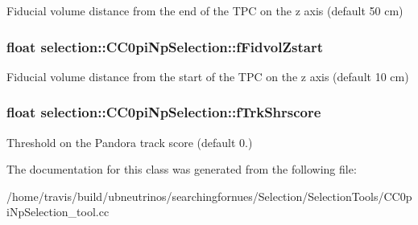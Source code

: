 Fiducial volume distance from the end of the T\-P\-C on the z axis (default 50 cm) \hypertarget{classselection_1_1CC0piNpSelection_afe5a2b82ecad103b98362839094c47e0}{
\subsubsection[{f\-Fidvol\-Zstart}]{\setlength{\rightskip}{0pt plus 5cm}float selection\-::\-C\-C0pi\-Np\-Selection\-::f\-Fidvol\-Zstart\hspace{0.3cm}{\ttfamily [private]}}}\label{classselection_1_1CC0piNpSelection_afe5a2b82ecad103b98362839094c47e0}
Fiducial volume distance from the start of the T\-P\-C on the z axis (default 10 cm) \hypertarget{classselection_1_1CC0piNpSelection_ab72eccf7dab3acafa294a0d8f3e225a0}{
\subsubsection[{f\-Trk\-Shrscore}]{\setlength{\rightskip}{0pt plus 5cm}float selection\-::\-C\-C0pi\-Np\-Selection\-::f\-Trk\-Shrscore\hspace{0.3cm}{\ttfamily [private]}}}\label{classselection_1_1CC0piNpSelection_ab72eccf7dab3acafa294a0d8f3e225a0}
Threshold on the Pandora track score (default 0.) 

The documentation for this class was generated from the following file\-:\begin{DoxyCompactItemize}
\item 
/home/travis/build/ubneutrinos/searchingfornues/\-Selection/\-Selection\-Tools/C\-C0pi\-Np\-Selection\-\_\-tool.\-cc\end{DoxyCompactItemize}
